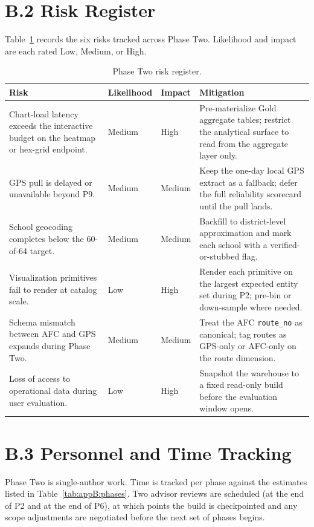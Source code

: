 \section*{B.2 Risk Register}

Table~\ref{tab:appB:risk} records the six risks tracked across Phase Two. Likelihood and impact are each rated Low, Medium, or High.

\begin{table}[!htbp]
\centering
\caption{Phase Two risk register.}
\label{tab:appB:risk}
\footnotesize
\renewcommand{\arraystretch}{1.25}
\begin{tabularx}{\linewidth}{X p{1.8cm} p{1.6cm} X}
\hline
\textbf{Risk} & \textbf{Likelihood} & \textbf{Impact} & \textbf{Mitigation} \\
\hline
Chart-load latency exceeds the interactive budget on the heatmap or hex-grid endpoint. & Medium & High & Pre-materialize Gold aggregate tables; restrict the analytical surface to read from the aggregate layer only. \\
GPS pull is delayed or unavailable beyond P9. & Medium & Medium & Keep the one-day local GPS extract as a fallback; defer the full reliability scorecard until the pull lands. \\
School geocoding completes below the 60-of-64 target. & Medium & Medium & Backfill to district-level approximation and mark each school with a verified-or-stubbed flag. \\
Visualization primitives fail to render at catalog scale. & Low & High & Render each primitive on the largest expected entity set during P2; pre-bin or down-sample where needed. \\
Schema mismatch between AFC and GPS expands during Phase Two. & Medium & Medium & Treat the AFC \texttt{route\_no} as canonical; tag routes as GPS-only or AFC-only on the route dimension. \\
Loss of access to operational data during user evaluation. & Low & High & Snapshot the warehouse to a fixed read-only build before the evaluation window opens. \\
\hline
\end{tabularx}
\end{table}

\section*{B.3 Personnel and Time Tracking}

Phase Two is single-author work. Time is tracked per phase against the estimates listed in Table~\ref{tab:appB:phases}. Two advisor reviews are scheduled (at the end of P2 and at the end of P6), at which points the build is checkpointed and any scope adjustments are negotiated before the next set of phases begins.

